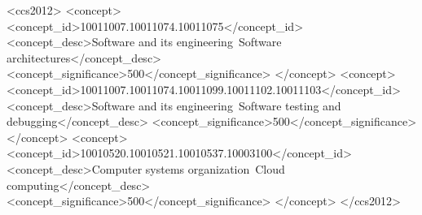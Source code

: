 \documentclass[sigconf, balance=false]{acmart}
\begin{document}
\begin{CCSXML}
<ccs2012>
   <concept>
       <concept_id>10011007.10011074.10011075</concept_id>
       <concept_desc>Software and its engineering~Software architectures</concept_desc>
       <concept_significance>500</concept_significance>
   </concept>
   <concept>
       <concept_id>10011007.10011074.10011099.10011102.10011103</concept_id>
       <concept_desc>Software and its engineering~Software testing and debugging</concept_desc>
       <concept_significance>500</concept_significance>
   </concept>
   <concept>
       <concept_id>10010520.10010521.10010537.10003100</concept_id>
       <concept_desc>Computer systems organization~Cloud computing</concept_desc>
       <concept_significance>500</concept_significance>
   </concept>
 </ccs2012>
\end{CCSXML}



\maketitle












\end{document}
